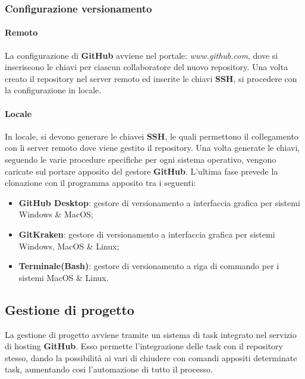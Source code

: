 \subsubsection{Configurazione versionamento}

\paragraph{Remoto ~\\}
	La configurazione di \textbf{GitHub} avviene nel portale: \textit{www.github.com}, dove si inseriscono le chiavi  per ciascun collaboratore del nuovo repository. 
	Una volta creato il repository nel server remoto ed inserite le chiavi \textbf{SSH}, si procedere con la configurazione in locale.
	
\paragraph{Locale ~\\}
	In locale, si devono generare le chiavei \textbf{SSH}, le quali permettono il collegamento con li server remoto dove viene gestito il repository. 
	Una volta generate le chiavi, seguendo le varie procedure specifiche per ogni sistema operativo, vengono caricate sul portare apposito del gestore \textbf{GitHub}.
	L'ultima fase prevede la clonazione con il programma apposito tra i seguenti: 

	\begin{itemize}
		\item \textbf{GitHub Desktop}: gestore di versionamento a interfaccia grafica per sistemi Windows \& MacOS; 
		\item \textbf{GitKraken}: gestore di versionamento a interfaccia grafica per sistemi Windows, MacOS \& Linux; 		
		\item \textbf{Terminale(Bash)}: gestore di versionamento a riga di commando per i sistemi MacOS \& Linux.
	\end{itemize}
		
\subsection{Gestione di progetto}
La gestione di progetto avviene tramite un sistema di task integrato nel servizio di hosting \textbf{GitHub}. 
Esso permette l'integrazione delle task con il repository stesso, dando la possibilità ai vari  di chiudere con comandi appositi determinate task, 
aumentando cosi l'automazione di tutto il processo. 

